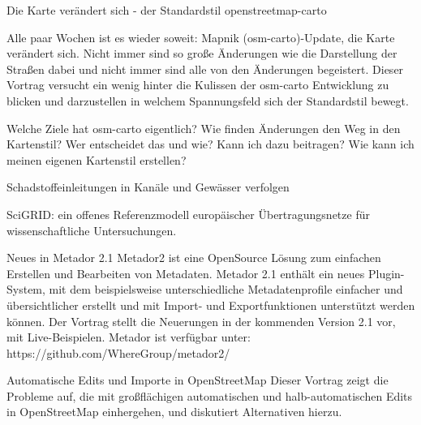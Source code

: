 {%
% 
}

%
{Die Karte verändert sich - der Standardstil openstreetmap-carto}%
{}%
{Alle paar Wochen ist es wieder soweit: Mapnik (osm-carto)-Update, die Karte verändert sich.
Nicht immer sind so große Änderungen wie die Darstellung der Straßen dabei und nicht immer sind
alle von den Änderungen begeistert. Dieser Vortrag versucht ein wenig hinter die Kulissen
der osm-carto Entwicklung zu blicken und darzustellen in welchem Spannungsfeld sich der Standardstil bewegt.

Welche Ziele hat osm-carto eigentlich? Wie finden Änderungen den Weg in den Kartenstil?
Wer entscheidet das und wie? Kann ich dazu beitragen? Wie kann ich meinen eigenen Kartenstil erstellen?}

%
{Schadstoffeinleitungen in Kanäle und Gewässer verfolgen}%
{}%
{}

%
{SciGRID: ein offenes Referenzmodell europäischer Übertragungsnetze für wissenschaftliche Untersuchungen.}%
{}%
{}

%
{Neues in Metador 2.1}%
{}%
{Metador2 ist eine OpenSource Lösung zum einfachen Erstellen und Bearbeiten von Metadaten. Metador 2.1 enthält ein neues Plugin-System, mit dem beispielsweise unterschiedliche Metadatenprofile einfacher und übersichtlicher erstellt und mit Import- und Exportfunktionen unterstützt werden können. Der Vortrag stellt die Neuerungen in der kommenden Version 2.1 vor, mit Live-Beispielen. Metador ist verfügbar unter: https://github.com/WhereGroup/metador2/}

%
{Automatische Edits und Importe in OpenStreetMap}%
{}%
{Dieser Vortrag zeigt die Probleme auf, die mit großflächigen automatischen und halb-automatischen Edits in OpenStreetMap einhergehen, und diskutiert Alternativen hierzu. }

